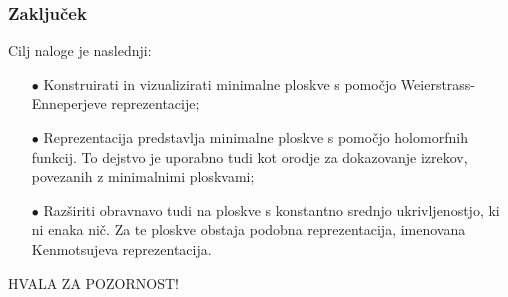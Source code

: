 \documentclass[10pt]{beamer}
\theoremstyle{definition}
\theoremstyle{remark}
\theoremstyle{plain}
\numberwithin{equation}{section}  %
\begin{document}
\begin{frame}
    \frametitle{Zaključek}

    Cilj naloge je naslednji:
    \begin{itemize}
        \item[$\bullet$] Konstruirati in vizualizirati minimalne ploskve s pomočjo Weierstrass-Enneperjeve reprezentacije;
        \item[$\bullet$] Reprezentacija predstavlja minimalne ploskve s pomočjo holomorfnih funkcij. To dejstvo je uporabno tudi kot orodje za dokazovanje izrekov, povezanih z minimalnimi ploskvami;
        \item[$\bullet$] Razširiti obravnavo tudi na ploskve s konstantno srednjo ukrivljenostjo, ki ni enaka nič. Za te ploskve obstaja podobna reprezentacija, imenovana Kenmotsujeva reprezentacija.
    \end{itemize}

\end{frame}

\begin{frame}
    \begin{center}
        \LARGE HVALA ZA POZORNOST!
    \end{center}
\end{frame}
\end{document}

